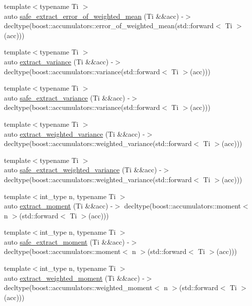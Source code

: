 \begin{DoxyCompactItemize}
\item 
{\footnotesize template$<$typename Ti $>$ }\\auto \hyperlink{namespaceIceBRG_a504319d2e3f772df661baf7683b9228b}{safe\+\_\+extract\+\_\+error\+\_\+of\+\_\+weighted\+\_\+mean} (Ti \&\&acc) -\/$>$ decltype(boost\+::accumulators\+::error\+\_\+of\+\_\+weighted\+\_\+mean(std\+::forward$<$ Ti $>$(acc)))
\item 
{\footnotesize template$<$typename Ti $>$ }\\auto \hyperlink{namespaceIceBRG_a8984d996a3218f6f25237d4abfd8e6e9}{extract\+\_\+variance} (Ti \&\&acc) -\/$>$ decltype(boost\+::accumulators\+::variance(std\+::forward$<$ Ti $>$(acc)))
\item 
{\footnotesize template$<$typename Ti $>$ }\\auto \hyperlink{namespaceIceBRG_a1148efd8f20b36a1ae36cde5e846d1cf}{safe\+\_\+extract\+\_\+variance} (Ti \&\&acc) -\/$>$ decltype(boost\+::accumulators\+::variance(std\+::forward$<$ Ti $>$(acc)))
\item 
{\footnotesize template$<$typename Ti $>$ }\\auto \hyperlink{namespaceIceBRG_a7ba80483c5dd983ec5885955aede683b}{extract\+\_\+weighted\+\_\+variance} (Ti \&\&acc) -\/$>$ decltype(boost\+::accumulators\+::weighted\+\_\+variance(std\+::forward$<$ Ti $>$(acc)))
\item 
{\footnotesize template$<$typename Ti $>$ }\\auto \hyperlink{namespaceIceBRG_ad04e308c37c6d964cdfd5d1adf2dda69}{safe\+\_\+extract\+\_\+weighted\+\_\+variance} (Ti \&\&acc) -\/$>$ decltype(boost\+::accumulators\+::weighted\+\_\+variance(std\+::forward$<$ Ti $>$(acc)))
\item 
{\footnotesize template$<$int\+\_\+type n, typename Ti $>$ }\\auto \hyperlink{namespaceIceBRG_a2d8804cbac17895c9a8c38d9d7592795}{extract\+\_\+moment} (Ti \&\&acc) -\/$>$ decltype(boost\+::accumulators\+::moment$<$ n $>$(std\+::forward$<$ Ti $>$(acc)))
\item 
{\footnotesize template$<$int\+\_\+type n, typename Ti $>$ }\\auto \hyperlink{namespaceIceBRG_a5a4e94e443d9c7d31491031dff9dd2b6}{safe\+\_\+extract\+\_\+moment} (Ti \&\&acc) -\/$>$ decltype(boost\+::accumulators\+::moment$<$ n $>$(std\+::forward$<$ Ti $>$(acc)))
\item 
{\footnotesize template$<$int\+\_\+type n, typename Ti $>$ }\\auto \hyperlink{namespaceIceBRG_ae8f57dd98ef9adb164062bcac6818a4b}{extract\+\_\+weighted\+\_\+moment} (Ti \&\&acc) -\/$>$ decltype(boost\+::accumulators\+::weighted\+\_\+moment$<$ n $>$(std\+::forward$<$ Ti $>$(acc)))

\end{DoxyCompactItemize}
